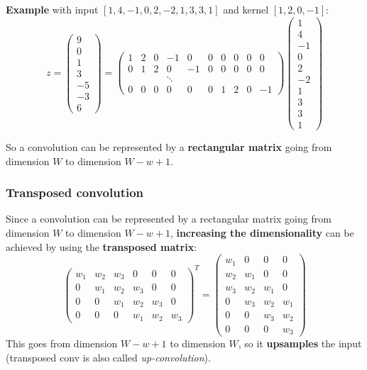 \textbf{Example } with input $[1,4,-1,0,2,-2,1,3,3,1]$ and kernel $[1,2,0,-1]$:
\[
z = \begin{pmatrix} 9 \\ 0 \\ 1 \\ 3 \\ -5 \\ -3 \\ 6 \end{pmatrix}
=
\begin{pmatrix}
1 & 2 & 0 & -1 & 0 & 0 & 0 & 0 & 0 & 0 \\
0 & 1 & 2 & 0 & -1 & 0 & 0 & 0 & 0 & 0 \\
& & & \ddots & & & & & & \\
0 & 0 & 0 & 0 & 0 & 0 & 1 & 2 & 0 & -1
\end{pmatrix}
\begin{pmatrix} 1 \\ 4 \\ -1 \\ 0 \\ 2 \\ -2 \\ 1 \\ 3 \\ 3 \\ 1 \end{pmatrix}
\]

So a convolution can be represented by a \textbf{rectangular matrix} going from dimension $W$ 
to dimension $W - w + 1$.

\subsubsection{Transposed convolution}
Since a convolution can be represented by a rectangular matrix going from dimension $W$ to 
dimension $W - w + 1$, \textbf{increasing the dimensionality} can be achieved by using the 
\textbf{transposed matrix}:
\[
\begin{pmatrix}
w_1 & w_2 & w_3 & 0 & 0 & 0 \\
0 & w_1 & w_2 & w_3 & 0 & 0 \\
0 & 0 & w_1 & w_2 & w_3 & 0 \\
0 & 0 & 0 & w_1 & w_2 & w_3
\end{pmatrix}^T 
=
\begin{pmatrix}
w_1 & 0 & 0 & 0 \\
w_2 & w_1 & 0 & 0 \\
w_3 & w_2 & w_1 & 0 \\
0 & w_3 & w_2 & w_1 \\
0 & 0 & w_3 & w_2 \\
0 & 0 & 0 & w_3
\end{pmatrix}
\]
This goes from dimension $W - w + 1$ to dimension $W$, so it \textbf{upsamples} the input 
(transposed conv is also called \emph{up-convolution}).

